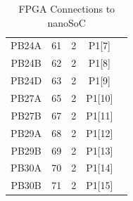 \documentclass{article}
\begin{document}
\begin{table}[h!]
\begin{tabular}{ c c c c c}
    PB24A   & 61    & 2    & P1[7]  &   \\
    PB24B   & 62    & 2    & P1[8]  &   \\
    PB24D   & 63    & 2    & P1[9]  &   \\
    PB27A   & 65    & 2    & P1[10] &   \\
    PB27B   & 67    & 2    & P1[11] &   \\
    PB29A   & 68    & 2    & P1[12] &   \\
    PB29B   & 69    & 2    & P1[13] &   \\
    PB30A   & 70    & 2    & P1[14] &   \\
    PB30B   & 71    & 2    & P1[15] &   
    \end{tabular}
    \caption{FPGA Connections to nanoSoC}
    \label{table:fpga_nanosoc}
\end{table}
\end{document}
